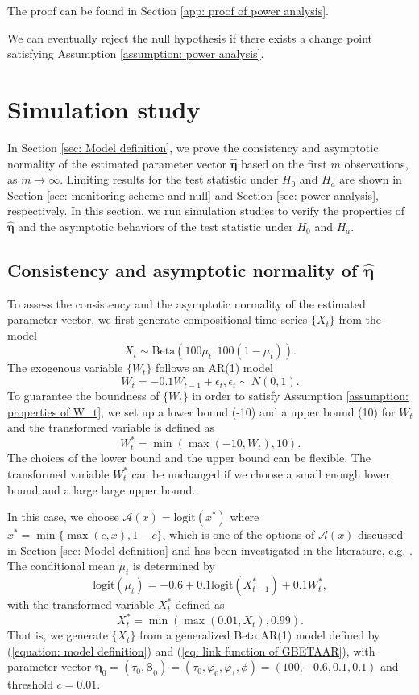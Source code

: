 \documentclass{article}
\theoremstyle{definition}
\begin{document}
The proof can be found in Section \ref{app: proof of power analysis}.

We can eventually reject the null hypothesis if there exists a change point satisfying Assumption \ref{assumption: power analysis}.

\section{Simulation study}
\label{sec: simulation}
In Section \ref{sec: Model definition}, we prove the consistency and asymptotic normality of the estimated parameter vector $\hat{\bm{\eta}}$ based on the first $m$ observations, as $m \rightarrow \infty$. Limiting results for the test statistic under $H_0$ and $H_a$ are shown in Section \ref{sec: monitoring scheme and null} and Section \ref{sec: power analysis}, respectively. In this section, we run simulation studies to verify the properties of $\hat{\bm{\eta}}$ and the asymptotic behaviors of the test statistic under $H_0$ and $H_a$.
\subsection{Consistency and asymptotic normality of $\hat{\bm{\eta}}$}
\label{subsec: simulation-consistency and normality}
To assess the consistency and the asymptotic normality of the estimated parameter vector, we first generate compositional time series $\{X_t\}$ from the model
\begin{equation}
\label{equation: simulation consistency model}
X_t \sim \text{Beta} (100 \mu_t, 100(1-\mu_t)).
\end{equation}
The exogenous variable $\{W_t\}$ follows an AR(1) model
\begin{equation*}
    W_t = -0.1 W_{t-1}+\epsilon_{t}, \epsilon_t \sim N(0,1).
\end{equation*}
To guarantee the boundness of $\{W_t\}$ in order to satisfy Assumption \ref{assumption: properties of W_t}, we set up a lower bound (-10) and a upper bound (10) for $W_t$ and the transformed variable is defined as 
$$W_t^* = \min(\max(-10, W_t), 10).$$
The choices of the lower bound and the upper bound can be flexible. The transformed variable $W^*_t$ can be unchanged if we choose a small enough lower bound and a large large upper bound. 

In this case, we choose $\mathcal{A}(x) = \text{logit}(x^*)$ where $x^* = \min\{\max(c,x),1-c\}$, which is one of the options of $\mathcal{A}(x)$ discussed in Section \ref{sec: Model definition} and has been investigated in the literature, e.g. \cite{woodard2010stationarity}. 
The conditional mean $\mu_t$ is determined by
\begin{equation}
\label{equation: determination of mu_t}
        \text{logit}(\mu_t) = -0.6+0.1 \text{logit}(X_{t-1}^*)+0.1 W_t^*,
\end{equation}
with the transformed variable $X_t^*$ defined as $$X_{t}^* = \min(\max(0.01, X_t), 0.99).$$ 
That is, we generate $\{X_t\}$ from a generalized Beta AR(1) model defined by (\ref{equation: model definition}) and (\ref{eq: link function of GBETAAR}), with parameter vector $\bm{\eta}_0 = (\tau_0, \bm{\beta}_0) = (\tau_0, \varphi_0, \varphi_1, \phi) = (100, -0.6, 0.1, 0.1)$ and threshold $c = 0.01$. 
\end{document}
